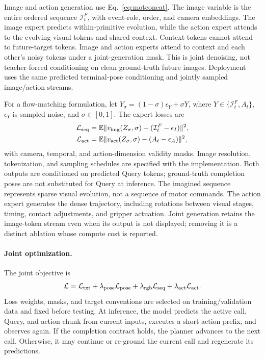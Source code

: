 Image and action generation use Eq.~\ref{eq:motconcat}. The image variable is the entire ordered sequence $\mathcal I_t^F$, with event-role, order, and camera embeddings. The image expert predicts within-primitive evolution, while the action expert attends to the evolving visual tokens and shared context. Context tokens cannot attend to future-target tokens. Image and action experts attend to context and each other's noisy tokens under a joint-generation mask. This is joint denoising, not teacher-forced conditioning on clean ground-truth future images. Deployment uses the same predicted terminal-pose conditioning and jointly sampled image/action streams.

For a flow-matching formulation, let $Y_\sigma=(1-\sigma)\epsilon_Y+\sigma Y$, where $Y\in\{\mathcal I_t^F,A_t\}$, $\epsilon_Y$ is sampled noise, and $\sigma\in[0,1]$. The expert losses are
\begin{align}
\mathcal L_{\rm seq}&=\mathbb E\|v_{\rm img}(Z_\sigma,\sigma)-(\mathcal I_t^F-\epsilon_I)\|^2,\\
\mathcal L_{\rm act}&=\mathbb E\|v_{\rm act}(Z_\sigma,\sigma)-(A_t-\epsilon_A)\|^2,
\label{eq:action}
\end{align}
with camera, temporal, and action-dimension validity masks. Image resolution, tokenization, and sampling schedules are specified with the implementation. Both outputs are conditioned on predicted Query tokens; ground-truth completion poses are not substituted for Query at inference. The imagined sequence represents sparse visual evolution, not a sequence of motor commands. The action expert generates the dense trajectory, including rotations between visual stages, timing, contact adjustments, and gripper actuation. Joint generation retains the image-token stream even when its output is not displayed; removing it is a distinct ablation whose compute cost is reported.
\paragraph{Joint optimization.}
The joint objective is
\begin{equation}
\mathcal L=\mathcal L_{\rm txt}+\lambda_{\rm pose}\mathcal L_{\rm pose}
+\lambda_{\rm rgb}\mathcal L_{\rm seq}+\lambda_{\rm act}\mathcal L_{\rm act}.
\label{eq:total}
\end{equation}
Loss weights, masks, and target conventions are selected on training/validation data and fixed before testing. At inference, the model predicts the active call, Query, and action chunk from current inputs, executes a short action prefix, and observes again. If the completion contract holds, the planner advances to the next call. Otherwise, it may continue or re-ground the current call and regenerate its predictions.

